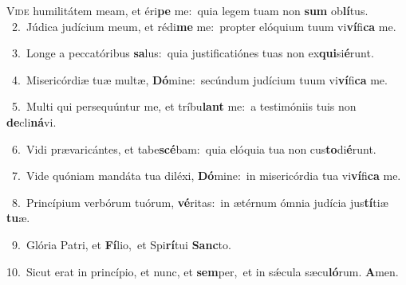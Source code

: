 \lettrine{\initial\textcolor{\initialcolor}{V}}{ide} humilitátem meam, et éri\textbf{pe} me:~\star quia legem tuam non \textbf{sum} ob\-\textbf{lí}\-tus.\\
{\numbfont\textcolor{\numbcolor}{~2.}}~Júdica judícium meum, et rédi\textbf{me} me:~\star propter elóquium tuum vi\-\textbf{ví}\-fi\textbf{ca} me.\par
{\numbfont\textcolor{\numbcolor}{~3.}}~Longe a peccatóribus \textbf{sa}\-lus:~\star quia justificatiónes tuas non ex\-\textbf{qui}\-si\-\textbf{é}\-runt.\par
{\numbfont\textcolor{\numbcolor}{~4.}}~Misericórdiæ tuæ multæ, \textbf{Dó}\-mine:~\star secúndum judícium tuum vi\-\textbf{ví}\-fi\textbf{ca} me.\par
{\numbfont\textcolor{\numbcolor}{~5.}}~Multi qui persequúntur me, et tríbu\textbf{lant} me:~\star a testimóniis tuis non \textbf{de}\-cli\-\textbf{ná}\-vi.\par
{\numbfont\textcolor{\numbcolor}{~6.}}~Vidi prævaricántes, et tabe\-\textbf{scé}\-bam:~\star quia elóquia tua non cus\-\textbf{to}\-di\-\textbf{é}\-runt.\par
{\numbfont\textcolor{\numbcolor}{~7.}}~Vide quóniam mandáta tua diléxi, \textbf{Dó}\-mine:~\star in misericórdia tua vi\-\textbf{ví}\-fi\textbf{ca} me.\par
{\numbfont\textcolor{\numbcolor}{~8.}}~Princípium verbórum tuórum, \textbf{vé}\-ritas:~\star in ætérnum ómnia judícia jus\-\textbf{tí}\-tiæ \textbf{tu}\-æ.\par
{\numbfont\textcolor{\numbcolor}{~9.}}~Glória Patri, et \textbf{Fí}\-lio,~\star et Spi\-\textbf{rí}\-tui \textbf{Sanc}\-to.\par
{\numbfont\textcolor{\numbcolor}{10.}}~Sicut erat in princípio, et nunc, et \textbf{sem}\-per,~\star et in sǽcula sæcu\-\textbf{ló}\-rum. \textbf{A}\-men.\par
